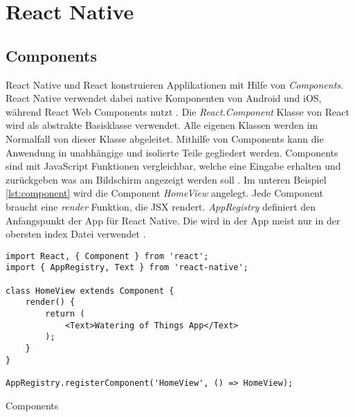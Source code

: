 \section{React Native}

\subsection{Components}
React Native und React konstruieren Applikationen mit Hilfe von \textit{Components}. React Native verwendet dabei native Komponenten von Android und iOS, während React Web Components nutzt  \cite{facebook_inc._getting_2017}. Die \textit{React.Component} Klasse von React wird als abstrakte Basisklasse verwendet. Alle eigenen Klassen werden im Normalfall von dieser Klasse abgeleitet. Mithilfe von Components kann die Anwendung in unabhängige und isolierte Teile gegliedert werden. Components sind mit JavaScript Funktionen vergleichbar, welche eine Eingabe erhalten und zurückgeben was am Bildschirm angezeigt werden soll \cite{facebook_inc._components_2017}. Im unteren Beispiel \ref{lst:component} wird die Component \textit{HomeView} angelegt. Jede Component braucht eine \textit{render} Funktion, die JSX rendert. \textit{AppRegistry} definiert den Anfangspunkt der App für React Native. Die wird in der App meist nur in der obersten index Datei verwendet \cite{facebook_inc._getting_2017}. 

\begin{listing}[H]
    \begin{verbatim}
import React, { Component } from 'react';
import { AppRegistry, Text } from 'react-native';

class HomeView extends Component {
    render() {
        return (
            <Text>Watering of Things App</Text>
        );
    }
}

AppRegistry.registerComponent('HomeView', () => HomeView);
    \end{verbatim}
    \caption{Components}
    \label{lst:component}
\end{listing}

